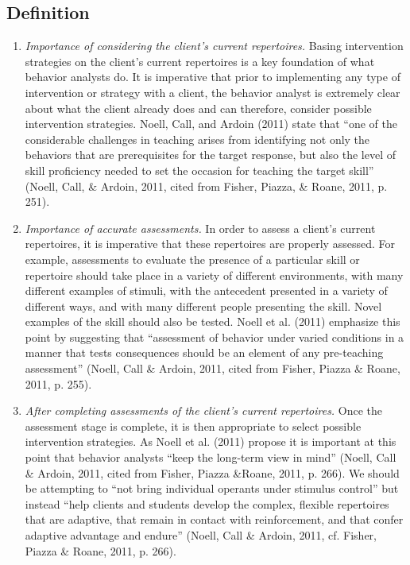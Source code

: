 \subsection{Definition}
\begin{enumerate}
\item \textit{Importance of considering the client's current repertoires.} Basing intervention strategies on the client's current repertoires is a key foundation of what behavior analysts do. It is imperative that prior to implementing any type of intervention or strategy with a client, the behavior analyst is extremely clear about what the client already does and can therefore, consider possible intervention strategies. Noell, Call, and Ardoin (2011) state that ``one of the considerable challenges in teaching arises from identifying not only the behaviors that are prerequisites for the target response, but also the level of skill proficiency needed to set the occasion for teaching the target skill'' (Noell, Call, \& Ardoin, 2011, cited from Fisher, Piazza, \& Roane, 2011, p. 251).
%
\item \textit{Importance of accurate assessments.} In order to assess a client's current repertoires, it is imperative that these repertoires are properly assessed. For example, assessments to evaluate the presence of a particular skill or repertoire should take place in a variety of different environments, with many different examples of stimuli, with the antecedent presented in a variety of different ways, and with many different people presenting the skill. Novel examples of the skill should also be tested. Noell et al. (2011) emphasize this point by suggesting that ``assessment of behavior under varied conditions in a manner that tests consequences should be an element of any pre-teaching assessment'' (Noell, Call \& Ardoin, 2011, cited from Fisher, Piazza \& Roane, 2011, p. 255). 

\item \textit{After completing assessments of the client's current repertoires.} Once the assessment stage is complete, it is then appropriate to select possible intervention strategies. As Noell et al. (2011) propose it is important at this point that behavior analysts ``keep the long-term view in mind'' (Noell, Call \& Ardoin, 2011, cited from Fisher, Piazza \&Roane, 2011, p. 266).  We should be attempting to ``not bring individual operants under stimulus control'' but instead ``help clients and students develop the complex, flexible repertoires that are adaptive, that remain in contact with reinforcement, and that confer adaptive advantage and endure'' (Noell, Call \& Ardoin, 2011, cf. Fisher, Piazza \& Roane, 2011, p. 266).
%
\end{enumerate}
%
